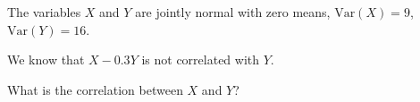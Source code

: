 
\begin{question}
The variables \(X\) and \(Y\) are jointly normal with zero means, \(\mathrm{Var}(X) = 9\),
\(\mathrm{Var}(Y) = 16\).

We know that \(X -0.3 Y\) is not correlated with \(Y\).

What is the correlation between \(X\) and \(Y\)?
\end{question}


